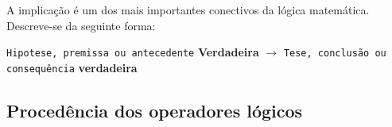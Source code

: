 \documentclass[12pt, onecolumn]{article}
\begin{document}
		A implicação é um dos mais importantes conectivos da lógica 
		matemática. Descreve-se da seguinte forma: 

		\begin{center}
			\texttt{Hipotese, premissa ou antecedente} 
			\textbf{Verdadeira} 
			$\longrightarrow$
			\texttt{Tese, conclusão ou consequência} 
			\textbf{verdadeira}
		\end{center}

		\subsection{Procedência dos operadores lógicos}	
		
		
\end{document}
